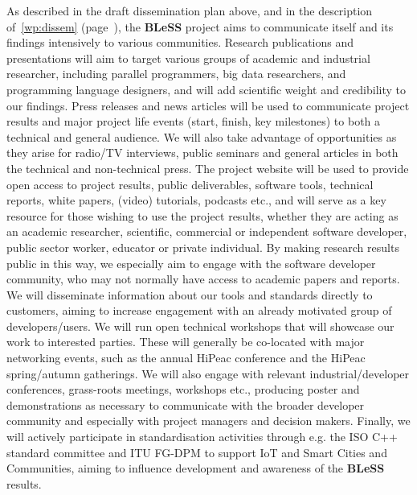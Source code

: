 \documentclass[a4paper,11pt]{article}
\newcommand{\project}[1]{\textbf{#1}\xspace}
\newcommand{\BLESS}{\project{BLeSS}}
\newcommand{\TheProject}{\BLESS}
\begin{document}
As described in the draft dissemination plan above, and in the description of~\ref{wp:dissem} (page~\pageref{wp:dissem}),
the \TheProject{} project aims to communicate itself and its findings intensively to various communities.
Research publications and presentations will aim to target various groups of academic and industrial researcher,
including parallel programmers, big data researchers, and programming language
designers, and will add scientific weight and credibility to our findings.  Press releases and news articles will be used to communicate project results and major
project life events (start, finish, key milestones) to both a technical and general audience.
We will also take advantage of opportunities as they arise for radio/TV interviews, public seminars and general articles
in both the technical and non-technical press.
The project website will be used to provide open access to project results, public deliverables,
software tools, technical reports, white papers, (video) tutorials, podcasts etc., and will serve
as a key resource for those wishing to use the project results, whether they are acting as an academic researcher, scientific, commercial or independent
software developer, public sector worker,  educator or private individual.
By making research results public in this way, we especially aim to engage with the software developer
community, who may not normally have access to academic papers and reports.
We will disseminate information about our tools and standards directly to customers, aiming to
increase engagement with an already motivated group of developers/users.
We will run open technical workshops that will showcase our work to interested parties.
These will generally be co-located with major networking events, such as the annual HiPeac
conference and the HiPeac spring/autumn gatherings.
We will also engage with relevant industrial/developer conferences, grass-roots meetings, workshops etc.,
producing poster and demonstrations as necessary to communicate with the broader developer community
and especially with project managers and decision makers.
Finally, we will actively participate in standardisation activities through e.g. the ISO C++ standard committee and ITU FG-DPM to support IoT and Smart Cities and Communities,
aiming to influence development and awareness of the \TheProject{} results.

\clearpage

\end{document}
